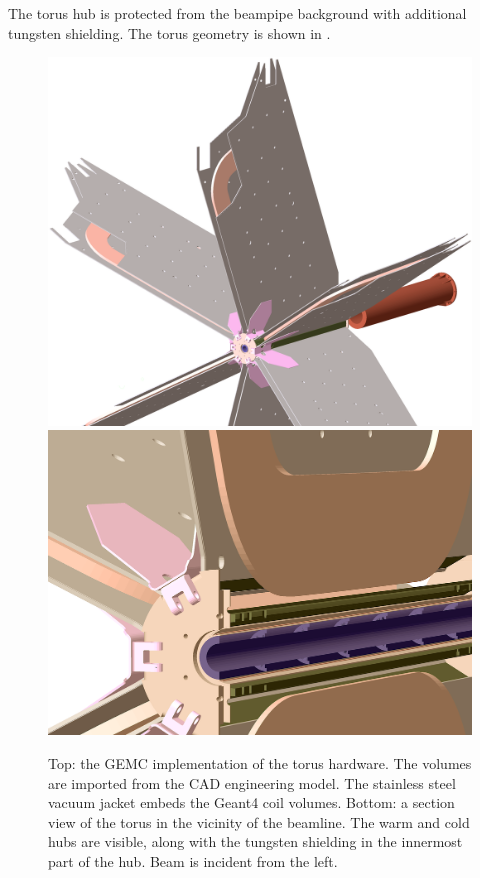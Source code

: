 The torus hub is protected from the beampipe background with additional tungsten shielding.
The torus geometry is shown in .

\begin{figure}
	\centering
	\includegraphics[width=0.99\columnwidth,keepaspectratio]{img/torusGeometry.png}
	\includegraphics[width=0.99\columnwidth,keepaspectratio]{img/torusDetail.png}
	\caption{Top: the GEMC implementation of the torus hardware. The volumes are imported from the CAD engineering model.
             The stainless steel vacuum jacket embeds the Geant4 coil volumes.
			 Bottom: a section view of the torus in the vicinity of the beamline. The warm and cold hubs are visible, along with the
			 tungsten shielding in the innermost part of the hub. Beam is incident from the left.}
	\label{fig:torus}
\end{figure}


